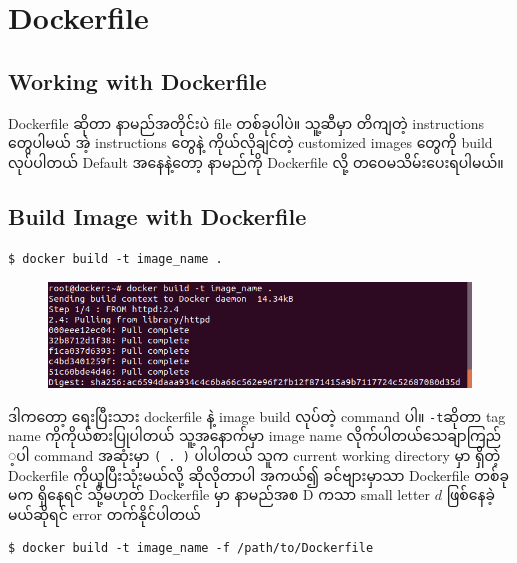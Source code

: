 \documentclass{article}
\begin{document}
\pagebreak

\section{Dockerfile}\label{dockerfile}

\subsection{Working with Dockerfile}\label{working-with-dockerfile}

Dockerfile ဆိုတာ နာမည်​အတိုင်းပဲ file တစ်​ခုပါပဲ။ သူ့ဆီမှာ တိကျတဲ့
instructions ​တွေပါမယ်​ အဲ့ instructions ​တွေနဲ့ ကိုယ်​လိုချင်​တဲ့
customized images ​တွေကို​ build လုပ်​ပါတယ်​ Default အ​နေနဲ့​တော့
နာမည်​ကို Dockerfile လို့ တ​ဝေမသိမ်း​ပေးရပါမယ်​။

\subsection{Build Image with
Dockerfile}\label{build-image-with-dockerfile}

\begin{verbatim}
$ docker build -t image_name .
\end{verbatim}

\begin{figure}[htbp]
\centering
\includegraphics[width=0.70\paperwidth]{.gitbook/assets/1_docker_build.png}
\end{figure}

ဒါက​တော့ ​ရေးပြီးသား dockerfile နဲ့ image build လုပ်​တဲ့ command ပါ။
\texttt{-t}ဆိုတာ tag name ကိုကိုယ်​စားပြုပါတယ်​ သူ့အ​နောက်​မှာ image
name လိုက်​ပါတယ်​ ​သေချာကြည်​့ပါ command အဆုံးမှာ \texttt{( . )}
ပါပါတယ်​ သူက current working directory မှာ ရှိတဲ့ Dockerfile
ကိုယူပြီးသုံးမယ်​လို့ ဆိုလိုတာပါ အကယ်​၍ ခင်​​ဗျားမှာသာ Dockerfile
တစ်​ခုမက ရှိ​နေရင်​ သို့မဟုတ်​ Dockerfile မှာ နာမည်​အစ D ကသာ small
letter $d$ ဖြစ်​​နေခဲ့မယ်​ဆိုရင်​ error တက်​နိုင်​ပါတယ်​

\begin{verbatim}
$ docker build -t image_name -f /path/to/Dockerfile
\end{verbatim}
\end{document}
